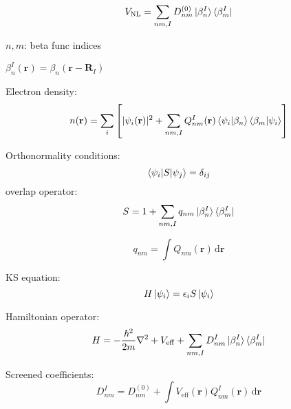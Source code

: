 \begin{frame}

\begin{equation*}
V_{\mathrm{NL}} = \sum_{nm,I} D^{(0)}_{nm} \ket{\beta^{I}_{n}}\bra{\beta^{I}_{m}}
\end{equation*}

$n,m$: beta func indices

$\beta^{I}_{n}(\mathbf{r}) = \beta_{n}(\mathbf{r} - \mathbf{R}_{I})$

Electron density:
\begin{equation*}
n(\mathbf{r}) = \sum_{i} \left[
| \psi_{i}(\mathbf{r}) |^{2} +
\sum_{nm,I} Q^{I}_{nm}(\mathbf{r}) \braket{ \psi_{i} | \beta_{n} }
\braket{ \beta_{m} | \psi_{i} }
\right]
\end{equation*}

\end{frame}


\begin{frame}

Orthonormality conditions:
\begin{equation*}
\braket{\psi_{i} | S | \psi_{j} } = \delta_{ij}
\end{equation*}
overlap operator:
\begin{equation*}
S = 1 + \sum_{nm,I} q_{nm} \ket{\beta^{I}_{n}} \bra{\beta^{I}_{m}}
\end{equation*}

\begin{equation*}
q_{nm} = \int Q_{nm}(\mathbf{r})\,\mathrm{d}\mathbf{r}
\end{equation*}

\end{frame}



\begin{frame} %

KS equation:
\begin{equation*}
H\ket{\psi_{i}} = \epsilon_{i} S \ket{\psi_{i}}
\end{equation*}

Hamiltonian operator:
\begin{equation*}
H = -\frac{\hbar^2}{2m} \nabla^2 + V_{\mathrm{eff}} +
\sum_{nm,I} D^{I}_{nm} \ket{\beta^{I}_{n}} \bra{\beta^{I}_{m}}
\end{equation*}

Screened coefficients:
\begin{equation*}
D^{I}_{nm} = D^{(0)}_{nm} + \int V_{\mathrm{eff}}(\mathbf{r})
Q^{I}_{nm}(\mathbf{r})\,\mathrm{d}\mathbf{r}
\end{equation*}

\end{frame}